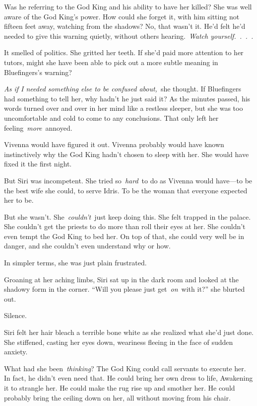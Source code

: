 Was he referring to the God King and his ability to have her killed? She was well aware of the God King’s power. How could she forget it, with him sitting not fifteen feet away, watching from the shadows? No, that wasn’t it. He’d felt he’d needed to give this warning quietly, without others hearing.~\textit{Watch yourself.~.~.~.}

It smelled of politics. She gritted her teeth. If she’d paid more attention to her tutors, might she have been able to pick out a more subtle meaning in Bluefingers’s warning?

\textit{As if I needed something else to be confused about,}~she thought. If Bluefingers had something to tell her, why hadn’t he just said it? As the minutes passed, his words turned over and over in her mind like a restless sleeper, but she was too uncomfortable and cold to come to any conclusions. That only left her feeling~\textit{more}~annoyed.

Vivenna would have figured it out. Vivenna probably would have known instinctively why the God King hadn’t chosen to sleep with her. She would have fixed it the first night.

But Siri was incompetent. She tried so~\textit{hard}~to do as Vivenna would have—to be the best wife she could, to serve Idris. To be the woman that everyone expected her to be.

But she wasn’t. She~\textit{couldn’t}~just keep doing this. She felt trapped in the palace. She couldn’t get the priests to do more than roll their eyes at her. She couldn’t even tempt the God King to bed her. On top of that, she could very well be in danger, and she couldn’t even understand why or how.

In simpler terms, she was just plain frustrated.

Groaning at her aching limbs, Siri sat up in the dark room and looked at the shadowy form in the corner. “Will you please just get~\textit{on}~with it?” she blurted out.

Silence.

Siri felt her hair bleach a terrible bone white as she realized what she’d just done. She stiffened, casting her eyes down, weariness fleeing in the face of sudden anxiety.

What had she been~\textit{thinking}? The God King could call servants to execute her. In fact, he didn’t even need that. He could bring her own dress to life, Awakening it to strangle her. He could make the rug rise up and smother her. He could probably bring the ceiling down on her, all without moving from his chair.

